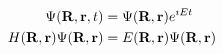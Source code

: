 \documentclass[slidestop,mathserif,compress,xcolor=svgnames]{beamer}
\begin{document}
\begin{frame}
\begin{itemize}
\begin{itemize}
\begin{align*}
\Psi({\bf R},{\bf r},t) &= \Psi({\bf R},{\bf r})e^{\imath Et}\\
H({\bf R},{\bf r})\Psi({\bf R},{\bf r}) &= E({\bf R},{\bf r})\Psi({\bf R},{\bf r})
\end{align*}
\end{itemize}
\end{itemize}
\end{frame}


\end{document}
